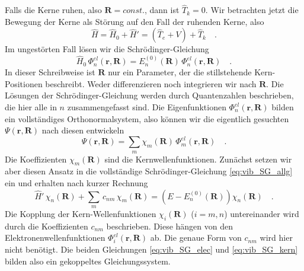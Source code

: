 Falls die Kerne ruhen, also $\mathbf{R} = const.$, dann ist $\hat{T}_k = 0$. Wir betrachten jetzt die Bewegung der Kerne als Störung auf den Fall der ruhenden Kerne, also
\begin{equation}
 \hat{H} = \hat{H}_0 + \hat{H}' = \left( \hat{T}_e + V \right) +  \hat{T}_k \quad .
\end{equation}
Im ungestörten Fall lösen wir die Schrödinger-Gleichung
\begin{equation}
\hat{H}_0 \, \Phi_n^{el}  (\mathbf{r}, \mathbf{R})  = E_n^{(0)}  (\mathbf{R})  \, \Phi_n^{el}  (\mathbf{r}, \mathbf{R})   \quad .  \label{eq:vib_SG_elec}
\end{equation}
In dieser Schreibweise ist $\mathbf{R}$ nur ein Parameter, der die stillstehende Kern-Positionen beschreibt. Weder differenzieren noch integrieren wir nach  $\mathbf{R}$. Die Lösungen der Schrödinger-Gleichung werden durch Quantenzahlen beschrieben, die hier alle in $n$ zusammengefasst sind. Die Eigenfunktionen $\Phi_n^{el}  (\mathbf{r}, \mathbf{R}) $ bilden ein vollständiges Orthonormalsystem, also können wir die eigentlich gesuchten $\Psi (\mathbf{r}, \mathbf{R})$ nach diesen entwickeln
\begin{equation}
\Psi (\mathbf{r}, \mathbf{R}) = \sum_m \chi_m (\mathbf{R}) \,\Phi_m^{el}  (\mathbf{r}, \mathbf{R})  \quad .
\end{equation}
Die Koeffizienten $\chi_m (\mathbf{R}) $ sind die Kernwellenfunktionen. Zunächst setzen wir aber diesen Ansatz in die vollständige Schrödinger-Gleichung   \ref{eq:vib_SG_allg} ein und erhalten nach kurzer Rechnung
\begin{equation}
\hat{H}' \, \chi_n (\mathbf{R}) + \sum_m \, c_{n m} \, \chi_m (\mathbf{R}) = \left( E - E_n^{(0)}(\mathbf{R})  \right) \chi_n (\mathbf{R})   \quad . \label{eq:vib_SG_kern}
\end{equation}
Die Kopplung der Kern-Wellenfunktionen $\chi_i (\mathbf{R}) $ ($i = m,n$) untereinander wird durch die Koeffizienten $c_{nm}$ beschrieben. Diese hängen von den Elektronenwellenfunktionen $\Phi_i^{el}  (\mathbf{r}, \mathbf{R}) $   ab. Die genaue Form von $c_{nm}$  wird hier nicht benötigt. Die beiden Gleichungen   \ref{eq:vib_SG_elec} und   \ref{eq:vib_SG_kern} bilden also ein gekoppeltes Gleichungssystem.

